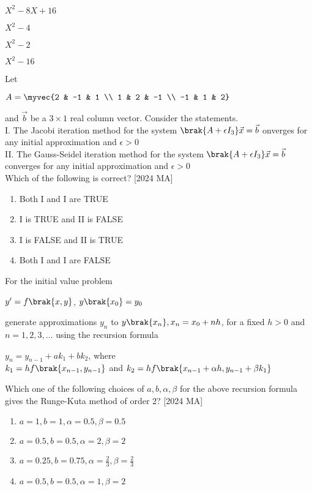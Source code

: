 \begin{enumerate}
\begin{multicols}{2}
    \item $X^2 - 8X + 16$
    \item $X^2 - 4$
    \item $X^2 - 2$
    \item $X^2 - 16$
\end{multicols}
\end{enumerate}
\item Let 
\begin{center}
    $A = \myvec{2 & -1 & 1 \\ 1 & 2 & -1 \\
    -1 & 1 & 2}$
\end{center}
and $\vec{b}$ be a $3 \times 1$ real column vector. Consider the statements. \\
I. The Jacobi iteration method for the system $\brak{A + \epsilon I_3} \vec{x} = \vec{b}$ onverges for any
initial approximation and $\epsilon > 0$ \\
II. The Gauss-Seidel iteration method for the system $\brak{A + \epsilon I_3} \vec{x} = \vec{b}$ converges for any initial approximation and $\epsilon > 0$ \\
Which of the following is correct? \hfill [2024 MA]
\begin{enumerate}
    \item Both I and I are TRUE
    \item I is TRUE and II is FALSE
    \item I is FALSE and II is TRUE
    \item Both I and I are FALSE
\end{enumerate}
\item For the initial value problem 
\begin{center}
    $y^\prime = f \brak{x,y}$,  $y \brak{x_0} = y_0$
\end{center}
generate approximations $y_n$ to $y\brak{x_n}, x_n = x_0 + nh$, for a fixed $h > 0$ and $n = 1,2,3, \dots$ using the recursion formula 
\begin{center}
    $y_n = y_{n-1} + ak_1 + bk_2$, where \\
    $k_1 = hf\brak{x_{n-1}, y_{n-1}}$ and $k_2 = hf\brak{x_{n-1} + \alpha h, y_{n-1} + \beta k_1}$
\end{center}
Which one of the following choices of $a,b, \alpha, \beta$ for the above recursion formula gives the Runge-Kuta method of order 2? \hfill [2024 MA]
\begin{enumerate}
    \item $a = 1, b = 1, \alpha = 0.5, \beta = 0.5 $
     \item $a = 0.5, b = 0.5, \alpha = 2, \beta = 2 $
      \item $a = 0.25, b = 0.75, \alpha = \frac{2}{3}, \beta = \frac{2}{3}$
       \item $a = 0.5, b = 0.5, \alpha = 1, \beta = 2 $
\end{enumerate}
